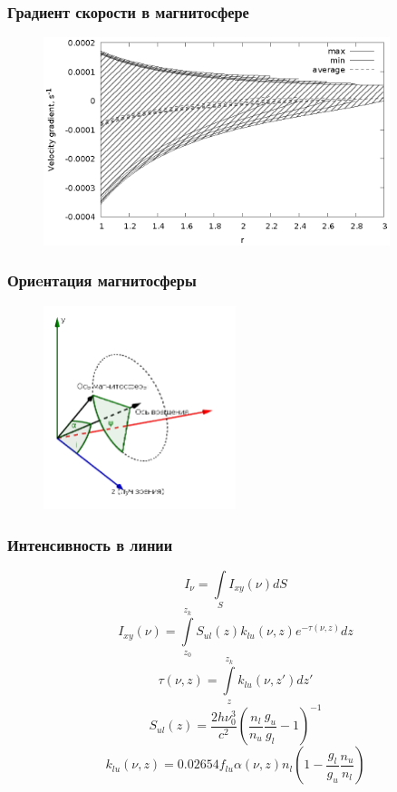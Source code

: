 \documentclass{beamer}
\begin{document}
\begin{frame}[noframenumbering]
\frametitle{Градиент скорости в магнитосфере}
\begin{figure}
\centering
\includegraphics[width=0.9\textwidth]{grad}
\end{figure}
\end{frame}

\begin{frame}[noframenumbering]
\frametitle{Ориeнтация магнитосферы}
\begin{figure}
\centering
\includegraphics[width=0.5\textwidth]{axis.png}
\end{figure}
\end{frame}

\begin{frame}[noframenumbering]
\frametitle{Интенсивность в линии}
\begin{equation} \label{eq:profmain}
I_{\nu} = \int \limits_{S} I_{xy}(\nu) dS
\end{equation}
\begin{equation}
I_{xy}(\nu) = \int \limits_{z_0}^{z_k} S_{ul}(z)k_{lu}(\nu,z)e^{-\tau(\nu,z)}dz 
\end{equation}
\begin{equation} \label{eq:profdepth}
\tau(\nu,z) = \int \limits_z^{z_k} k_{lu}(\nu,z')dz' 
\end{equation}
\begin{equation} \label{eq:profsource}
S_{ul}(z) = \frac{2h\nu_0^3}{c^2}\left(\frac{n_l}{n_u} \frac{g_u}{g_l} - 1 \right)^{-1} 
\end{equation}
\begin{equation} \label{eq:profabsorb}
k_{lu}(\nu,z) = 0.02654f_{lu}\alpha(\nu, z)n_l\left(1 - \frac{g_l}{g_u}\frac{n_u}{n_l}\right) 
\end{equation}

\end{frame}
\end{document}

